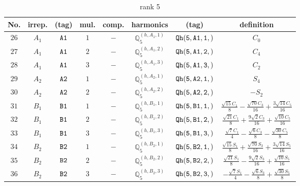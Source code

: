\documentclass[fleqn,8pt]{jsarticle}
\begin{document}
\begin{table}[ht!]
\begin{center}
\caption{rank 5}
\renewcommand{\arraystretch}{1.3}
\begin{tabular}{cccccccc} \hline \hline
No. & irrep. & (tag) & mul. & comp. & harmonics & (tag) & definition \\ \hline
$ 26 $ & $ A_{1} $ & $ {\tt A1} $ & $ 1 $ & $ - $ & $ \mathbb{Q}_{5}^{(h,A_{1},1)} $ & $ {\tt Qh(5,A1,1,)} $ & $ C_{0} $ \\
$ 27 $ & $ A_{1} $ & $ {\tt A1} $ & $ 2 $ & $ - $ & $ \mathbb{Q}_{5}^{(h,A_{1},2)} $ & $ {\tt Qh(5,A1,2,)} $ & $ C_{4} $ \\
$ 28 $ & $ A_{1} $ & $ {\tt A1} $ & $ 3 $ & $ - $ & $ \mathbb{Q}_{5}^{(h,A_{1},3)} $ & $ {\tt Qh(5,A1,3,)} $ & $ C_{2} $ \\
$ 29 $ & $ A_{2} $ & $ {\tt A2} $ & $ 1 $ & $ - $ & $ \mathbb{Q}_{5}^{(h,A_{2},1)} $ & $ {\tt Qh(5,A2,1,)} $ & $ S_{4} $ \\
$ 30 $ & $ A_{2} $ & $ {\tt A2} $ & $ 2 $ & $ - $ & $ \mathbb{Q}_{5}^{(h,A_{2},2)} $ & $ {\tt Qh(5,A2,2,)} $ & $ - S_{2} $ \\
$ 31 $ & $ B_{1} $ & $ {\tt B1} $ & $ 1 $ & $ - $ & $ \mathbb{Q}_{5}^{(h,B_{1},1)} $ & $ {\tt Qh(5,B1,1,)} $ & $ \frac{\sqrt{15} C_{1}}{8} - \frac{\sqrt{70} C_{3}}{16} + \frac{3 \sqrt{14} C_{5}}{16} $ \\
$ 32 $ & $ B_{1} $ & $ {\tt B1} $ & $ 2 $ & $ - $ & $ \mathbb{Q}_{5}^{(h,B_{1},2)} $ & $ {\tt Qh(5,B1,2,)} $ & $ \frac{\sqrt{21} C_{1}}{8} + \frac{9 \sqrt{2} C_{3}}{16} + \frac{\sqrt{10} C_{5}}{16} $ \\
$ 33 $ & $ B_{1} $ & $ {\tt B1} $ & $ 3 $ & $ - $ & $ \mathbb{Q}_{5}^{(h,B_{1},3)} $ & $ {\tt Qh(5,B1,3,)} $ & $ \frac{\sqrt{7} C_{1}}{4} - \frac{\sqrt{6} C_{3}}{8} - \frac{\sqrt{30} C_{5}}{8} $ \\
$ 34 $ & $ B_{2} $ & $ {\tt B2} $ & $ 1 $ & $ - $ & $ \mathbb{Q}_{5}^{(h,B_{2},1)} $ & $ {\tt Qh(5,B2,1,)} $ & $ \frac{\sqrt{15} S_{1}}{8} + \frac{\sqrt{70} S_{3}}{16} + \frac{3 \sqrt{14} S_{5}}{16} $ \\
$ 35 $ & $ B_{2} $ & $ {\tt B2} $ & $ 2 $ & $ - $ & $ \mathbb{Q}_{5}^{(h,B_{2},2)} $ & $ {\tt Qh(5,B2,2,)} $ & $ \frac{\sqrt{21} S_{1}}{8} - \frac{9 \sqrt{2} S_{3}}{16} + \frac{\sqrt{10} S_{5}}{16} $ \\
$ 36 $ & $ B_{2} $ & $ {\tt B2} $ & $ 3 $ & $ - $ & $ \mathbb{Q}_{5}^{(h,B_{2},3)} $ & $ {\tt Qh(5,B2,3,)} $ & $ - \frac{\sqrt{7} S_{1}}{4} - \frac{\sqrt{6} S_{3}}{8} + \frac{\sqrt{30} S_{5}}{8} $ \\
 \hline \hline
\end{tabular}
\end{center}
\end{table}
\end{document}

